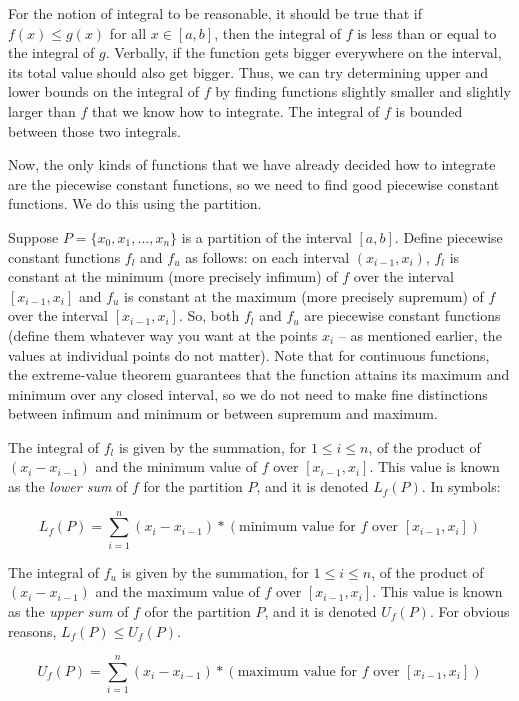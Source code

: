 \documentclass{amsart}
\begin{document}
For the notion of integral to be reasonable, it should be true that if
$f(x) \le g(x)$ for all $x \in [a,b]$, then the integral of $f$ is
less than or equal to the integral of $g$. Verbally, if the function
gets bigger everywhere on the interval, its total value should also
get bigger. Thus, we can try determining upper and lower bounds on the
integral of $f$ by finding functions slightly smaller and slightly
larger than $f$ that we know how to integrate. The integral of $f$ is
bounded between those two integrals.

Now, the only kinds of functions that we have already decided how to
integrate are the piecewise constant functions, so we need to find
good piecewise constant functions. We do this using the partition.

Suppose $P = \{ x_0, x_1, \dots, x_n \}$ is a partition of the
interval $[a,b]$. Define piecewise constant functions $f_l$ and $f_u$
as follows: on each interval $(x_{i-1},x_i)$, $f_l$ is constant at the
minimum (more precisely infimum) of $f$ over the interval
$[x_{i-1},x_i]$ and $f_u$ is constant at the maximum (more precisely
supremum) of $f$ over the interval $[x_{i-1},x_i]$. So, both $f_l$ and
$f_u$ are piecewise constant functions (define them whatever way you
want at the points $x_i$ -- as mentioned earlier, the values at
individual points do not matter). Note that for continuous functions,
the extreme-value theorem guarantees that the function attains its
maximum and minimum over any closed interval, so we do not need to
make fine distinctions between infimum and minimum or between supremum
and maximum.

The integral of $f_l$ is given by the summation, for $1 \le i \le n$,
of the product of $(x_i - x_{i-1})$ and the minimum value of $f$ over
$[x_{i-1},x_i]$. This value is known as the {\em lower sum} of $f$ for
the partition $P$, and it is denoted $L_f(P)$. In symbols:

$$L_f(P) = \sum_{i=1}^n (x_i - x_{i-1}) * \left(\text{minimum value for $f$ over $[x_{i-1},x_i]$}\right)$$

The integral of $f_u$ is given by the summation, for $1 \le i \le n$,
of the product of $(x_i - x_{i-1})$ and the maximum value of $f$ over
$[x_{i-1},x_i]$. This value is known as the {\em upper sum} of $f$
ofor the partition $P$, and it is denoted $U_f(P)$. For obvious
reasons, $L_f(P) \le U_f(P)$.

$$U_f(P) = \sum_{i=1}^n (x_i - x_{i-1}) * \left(\text{maximum value for $f$ over $[x_{i-1},x_i]$}\right)$$
\end{document}

